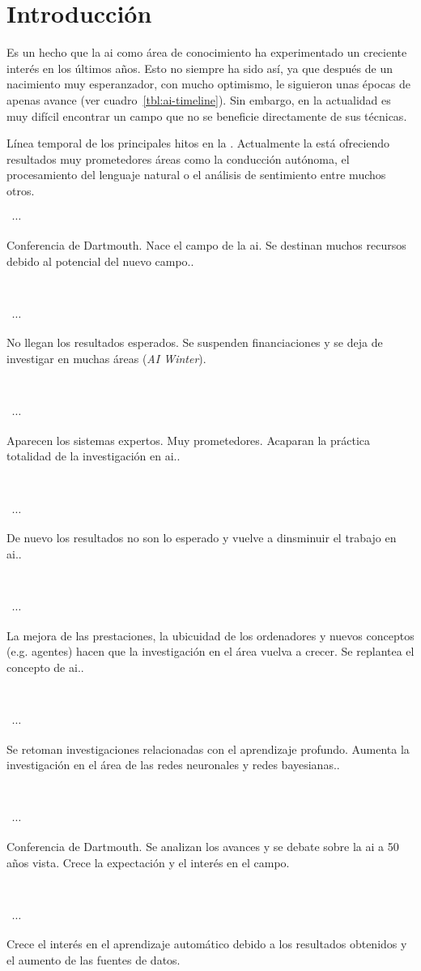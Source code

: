 \chapter{Introducción}
\label{ch:intro}

Es un hecho que la \ac{ai} como área de conocimiento ha experimentado un creciente interés en los últimos años. Esto no siempre ha sido así, ya que después de un nacimiento muy esperanzador, con mucho optimismo, le siguieron unas épocas de apenas avance (ver cuadro~\ref{tbl:ai-timeline}). Sin embargo, en la actualidad es muy difícil encontrar un campo que no se beneficie directamente de sus técnicas.

\begin{margintable}
	\caption{Línea temporal de los principales hitos en la . Actualmente la  está ofreciendo resultados muy prometedores áreas como la conducción autónoma, el procesamiento del lenguaje natural o el análisis de sentimiento entre muchos otros.}
	\label{tbl:ai-timeline}
	\centering
	\begin{minipage}[t]{\linewidth}
		\newcommand\ytl[2]{
			\parbox[b]{2cm}{\hfill{\color{cyan}\bfseries\sffamily #1}~$\cdots$~} \parbox[c]{2.8cm}{\vspace{7pt}\raggedright\sffamily #2.\\[0pt]}\\[0pt]}
		\color{gray}

		\ytl{1956}{Conferencia de Dartmouth. Nace el campo de la \ac{ai}. Se destinan muchos recursos debido al potencial del nuevo campo.}
		\ytl{1974}{No llegan los resultados esperados. Se suspenden financiaciones y se deja de investigar en muchas áreas (\textit{AI Winter})}
		\ytl{1980}{Aparecen los sistemas expertos. Muy prometedores. Acaparan la práctica totalidad de la investigación en \ac{ai}.}
		\ytl{1987}{De nuevo los resultados no son lo esperado y vuelve a dinsminuir el trabajo en \ac{ai}.}
		\ytl{1990}{La mejora de las prestaciones, la ubicuidad de los ordenadores y nuevos conceptos (e.g. agentes) hacen que la investigación en el área vuelva a crecer. Se replantea el concepto de \ac{ai}.}
		\ytl{2000}{Se retoman investigaciones relacionadas con el aprendizaje profundo. Aumenta la investigación en el área de las redes neuronales y redes bayesianas.}
		\ytl{2006}{Conferencia de Dartmouth. Se analizan los avances y se debate sobre la \ac{ai} a 50 años vista. Crece la expectación y el interés en el campo}
		\ytl{2007}{Crece el interés en el aprendizaje automático debido a los resultados obtenidos y el aumento de las fuentes de datos}
		\bigskip
	\end{minipage}%
\end{margintable}

